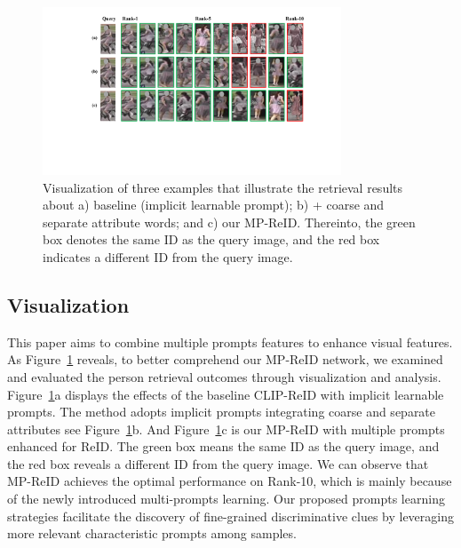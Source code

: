 \documentclass[letterpaper]{article} %
\begin{document}
\begin{figure}[t!]
    \centering
    \includegraphics[width=1.0\linewidth,height=5.0cm]{results.pdf}
    \caption{Visualization of three examples that illustrate the retrieval results about a) baseline (implicit learnable prompt); b) + coarse and separate attribute words; and c) our MP-ReID. Thereinto, the green box denotes the same ID as the query image, and the red box indicates a different ID from the query image.}
    \label{visual3}
\end{figure}

\subsection{Visualization} \label{visualizations}
This paper aims to combine multiple prompts features to enhance visual features. As Figure~\ref{visual3} reveals, to better comprehend our MP-ReID network, we examined and evaluated the person retrieval outcomes through visualization and analysis. Figure~\ref{visual3}a displays the effects of the baseline CLIP-ReID with implicit learnable prompts. The method adopts implicit prompts integrating coarse and separate attributes see Figure~\ref{visual3}b. And Figure~\ref{visual3}c is our MP-ReID with multiple prompts enhanced for ReID. The green box means the same ID as the query image, and the red box reveals a different ID from the query image. We can observe that MP-ReID achieves the optimal performance on Rank-10, which is mainly because of the newly introduced multi-prompts learning. Our proposed prompts learning strategies facilitate the discovery of fine-grained discriminative clues by leveraging more relevant characteristic prompts among samples.
\end{document}
